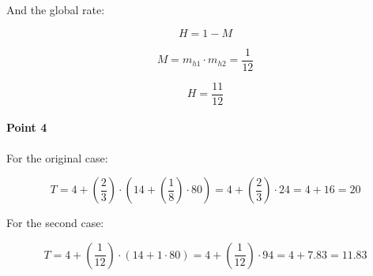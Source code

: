 And the global rate:

\[
H = 1 - M
\]

\[
M = m_{h1} \cdot m_{h2} = 
\frac{1}{12}
\]

\[
H = \frac{11}{12}
\]

\paragraph{Point 4}

For the original case:

\[
T = 
4 + (\frac{2}{3}) \cdot (14 + (\frac{1}{8}) \cdot 80) = 
4 + (\frac{2}{3}) \cdot 24 = 
4 +16 = 
20
\]

For the second case:

\[
T = 
4 + (\frac{1}{12}) \cdot (14 + 1 \cdot 80) = 
4 + (\frac{1}{12}) \cdot 94 = 
4 + 7.83 = 
11.83
\]

